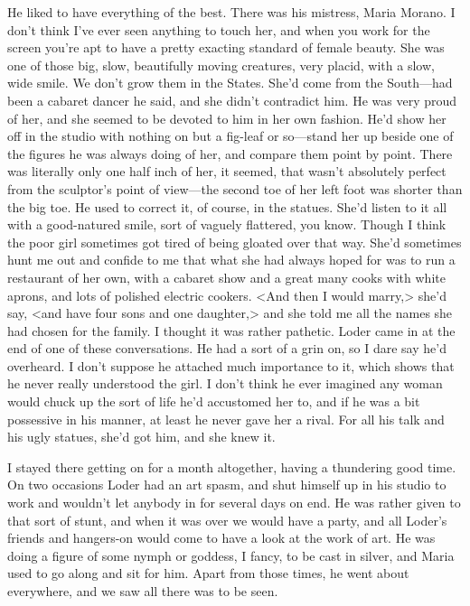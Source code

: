 He liked to have everything of the best. There was his mistress, Maria Morano. I don't think I've ever seen anything to touch her, and when you work for the screen you're apt to have a pretty exacting standard of female beauty. She was one of those big, slow, beautifully moving creatures, very placid, with a slow, wide smile. We don't grow them in the States. She'd come from the South—had been a cabaret dancer he said, and she didn't contradict him. He was very proud of her, and she seemed to be devoted to him in her own fashion. He'd show her off in the studio with nothing on but a fig-leaf or so—stand her up beside one of the figures he was always doing of her, and compare them point by point. There was literally only one half inch of her, it seemed, that wasn't absolutely perfect from the sculptor's point of view—the second toe of her left foot was shorter than the big toe. He used to correct it, of course, in the statues. She'd listen to it all with a good-natured smile, sort of vaguely flattered, you know. Though I think the poor girl sometimes got tired of being gloated over that way. She'd sometimes hunt me out and confide to me that what she had always hoped for was to run a restaurant of her own, with a cabaret show and a great many cooks with white aprons, and lots of polished electric cookers. <And then I would marry,> she'd say, <and have four sons and one daughter,> and she told me all the names she had chosen for the family. I thought it was rather pathetic. Loder came in at the end of one of these conversations. He had a sort of a grin on, so I dare say he'd overheard. I don't suppose he attached much importance to it, which shows that he never really understood the girl. I don't think he ever imagined any woman would chuck up the sort of life he'd accustomed her to, and if he was a bit possessive in his manner, at least he never gave her a rival. For all his talk and his ugly statues, she'd got him, and she knew it.

I stayed there getting on for a month altogether, having a thundering good time. On two occasions Loder had an art spasm, and shut himself up in his studio to work and wouldn't let anybody in for several days on end. He was rather given to that sort of stunt, and when it was over we would have a party, and all Loder's friends and hangers-on would come to have a look at the work of art. He was doing a figure of some nymph or goddess, I fancy, to be cast in silver, and Maria used to go along and sit for him. Apart from those times, he went about everywhere, and we saw all there was to be seen.

